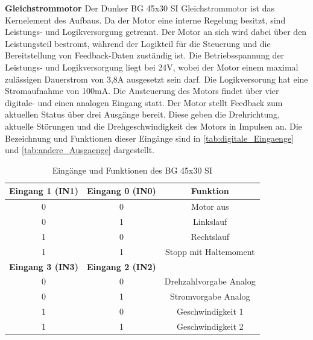 \noindent\textbf{Gleichstrommotor}\newline
Der Dunker BG 45x30 SI Gleichstrommotor ist das Kernelement des Aufbaus. Da der Motor eine interne Regelung besitzt, sind Leistungs- und Logikversorgung getrennt. Der Motor an sich wird dabei über den Leistungsteil bestromt, während der Logikteil für die Steuerung und die Bereitstellung von Feedback-Daten zuständig ist. Die Betriebsspannung der Leistungs- und Logikversorgung liegt bei 24V, wobei der Motor einem maximal zulässigen Dauerstrom von 3,8A ausgesetzt sein darf. Die Logikversorung hat eine Stromaufnahme von 100mA. Die Ansteuerung des Motors findet über vier digitale- und einen analogen Eingang statt. Der Motor stellt Feedback zum aktuellen Status über drei Ausgänge bereit. Diese geben die Drehrichtung, aktuelle Störungen und die Drehgeschwindigkeit des Motors in Impulsen an. Die Bezeichnung und Funktionen dieser Eingänge sind in \autoref{tab:digitale_Eingaenge} und \autoref{tab:andere_Ausgaenge} dargestellt.\\
\begin{table}[H]
	\centering
		\begin{tabular}{|c|c|c|}
			\hline
			\textbf{Eingang 1 (IN1)} & \textbf{Eingang 0 (IN0)} & \textbf{Funktion}      \\ \hline
			0                        & 0                        & Motor aus              \\ \hline
			0                        & 1                        & Linkslauf              \\ \hline
			1                        & 0                        & Rechtslauf             \\ \hline
			1                        & 1                        & Stopp mit Haltemoment  \\ \hline
			\textbf{Eingang 3 (IN3)} & \textbf{Eingang 2 (IN2)} &                        \\ \hline
			0                        & 0                        & Drehzahlvorgabe Analog \\ \hline
			0                        & 1                        & Stromvorgabe Analog    \\ \hline
			1                        & 0                        & Geschwindigkeit 1      \\ \hline
			1                        & 1                        & Geschwindigkeit 2      \\ \hline
		\end{tabular}%
	\caption{Eingänge und Funktionen des BG 45x30 SI}
	\label{tab:digitale_Eingaenge}
\end{table}
